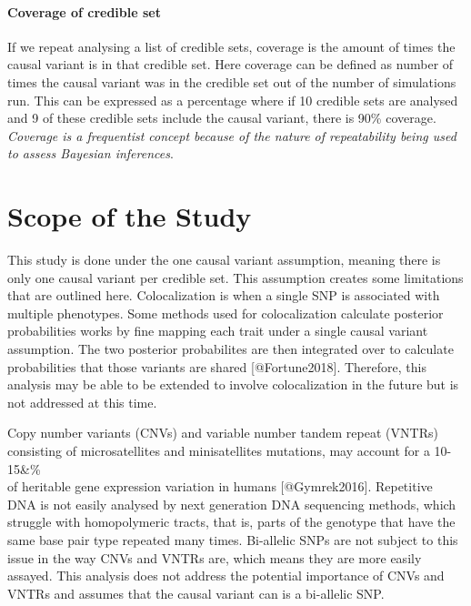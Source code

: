 \paragraph{Coverage of credible set}
If we repeat analysing a list of credible sets, coverage is the amount of times the causal variant is in that credible set. Here coverage can be defined as number of times the causal variant was in the credible set out of the number of simulations run. This can be expressed as a percentage where if 10 credible sets are analysed and 9 of these credible sets include the causal variant, there is 90\% coverage. \emph{Coverage is a frequentist concept because of the nature of repeatability being used to assess Bayesian inferences}. 



\section{Scope of the Study}

This study is done under the one causal variant assumption, meaning there is only one causal variant per credible set. This assumption creates some limitations that are outlined here. 
Colocalization is when a single SNP is associated with multiple phenotypes. Some methods used for colocalization calculate posterior probabilities works by fine mapping each trait under a single causal variant assumption. The two posterior probabilites are then integrated over to calculate probabilities that those variants are shared [@Fortune2018]. Therefore, this analysis may be able to be extended to involve colocalization in the future but is not addressed at this time.  

Copy number variants (CNVs) and variable number tandem repeat (VNTRs) consisting of microsatellites and minisatellites mutations, may account for a 10-15&\% \\ of heritable gene expression variation in humans [@Gymrek2016]. Repetitive DNA is not easily analysed by next generation DNA sequencing methods, which struggle with homopolymeric tracts, that is, parts of the genotype that have the same base pair type repeated many times. Bi-allelic SNPs are not subject to this issue in the way CNVs and VNTRs are, which means they are more easily assayed. This analysis does not address the potential importance of CNVs and VNTRs and assumes that the causal variant can is a bi-allelic SNP. 

